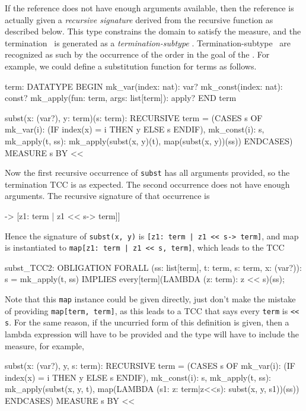 If the reference does not have enough arguments available, then the
reference is actually given a \emph{recursive signature} derived from the recursive function as described below.  This
type constrains the domain to satisfy the measure, and the termination
\tcc\ is generated as a \emph{termination-subtype}
\tcc.
Termination-subtype \tccs\ are recognized as such by the occurrence of the
order in the goal of the \tcc.  For example, we could define a
substitution function for terms as follows.
\begin{pvsex}
  term: DATATYPE
  BEGIN
   mk_var(index: nat): var?
   mk_const(index: nat): const?
   mk_apply(fun: term, args: list[term]): apply?
  END term

  subst(x: (var?), y: term)(s: term): RECURSIVE term =
    (CASES s OF
      mk_var(i): (IF index(x) = i THEN y ELSE s ENDIF),
      mk_const(i): s,
      mk_apply(t, ss): mk_apply(subst(x, y)(t), map(subst(x, y))(ss))
     ENDCASES)
  MEASURE s BY <<
\end{pvsex}
Now the first recursive occurrence of \texttt{subst} has all arguments
provided, so the termination TCC is as expected.  The second occurrence
does not have enough arguments.  The recursive signature of that
occurrence is
\begin{pvsex}
  [[(var?), term] -> [\setb{}z1: term | z1 << s\sete -> term]]
\end{pvsex}
Hence the signature of \texttt{subst(x, y)} is \texttt{[\setb{}z1:\ term | z1 <<
s\sete -> term]}, and map is instantiated to \texttt{map[\setb{}z1:\ term | z1 <<
s\sete, term]}, which leads to the TCC
\begin{pvsex}
subst_TCC2: OBLIGATION
  FORALL (ss: list[term], t: term, s: term, x: (var?)):
    s = mk_apply(t, ss) IMPLIES every[term](LAMBDA (z: term): z << s)(ss);
\end{pvsex}
Note that this \texttt{map} instance could be given directly, just don't
make the mistake of providing \texttt{map[term, term]}, as this leads to a
TCC that says every \texttt{term} is \texttt{<<} \texttt{s}.
For the same reason, if the uncurried form of this definition is given,
then a lambda expression will have to be provided and the type will have
to include the measure, for example,
\begin{pvsex}
   subst(x: (var?), y, s: term): RECURSIVE term =
     (CASES s OF
       mk_var(i): (IF index(x) = i THEN y ELSE s ENDIF),
       mk_const(i): s,
       mk_apply(t, ss): mk_apply(subst(x, y, t),
                                 map(LAMBDA (s1: \setb{}z: term|z<<s\sete):
                                       subst(x, y, s1))(ss))
      ENDCASES)
   MEASURE s BY <<
\end{pvsex}

